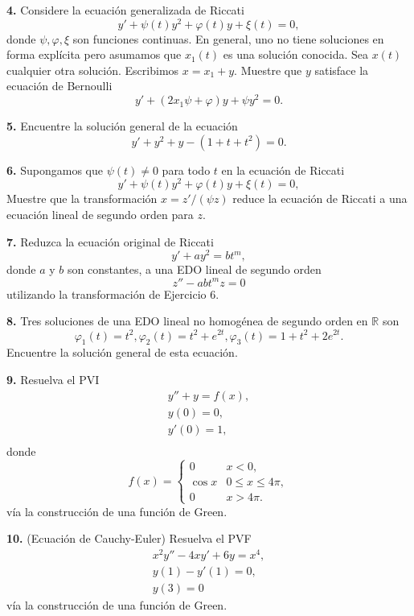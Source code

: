 \documentclass{article}
\newenvironment{statement}[1]{\smallskip\noindent\color[rgb]{1.00,0.00,0.50} {\bf #1.}}{}
\theoremstyle{definition}
\theoremstyle{remark}
\newcommand{\BR}{\mathbb R}
\begin{document}
\begin{statement}{4}
  Considere la ecuaci\'on generalizada de Riccati
  \[
    y' + \psi(t) y^2 + \varphi(t) y + \xi(t) = 0,
  \]
  donde $\psi, \varphi, \xi$ son funciones continuas.
  En general, uno no tiene soluciones en forma expl\'icita pero asumamos que
  $x_1(t)$ es una soluci\'on conocida. Sea $x(t)$ cualquier otra soluci\'on.
  Escribimos $x = x_1 + y$. Muestre que $y$ satisface la ecuaci\'on de Bernoulli
  \[
    y' + (2 x_1 \psi + \varphi) y + \psi y^2 = 0.  
  \]
\end{statement}

\begin{statement}{5}
  Encuentre la soluci\'on general de la ecuaci\'on
  \[
    y' + y^2 + y - (1 + t + t^2) = 0.  
  \]
\end{statement}

\begin{statement}{6}
  Supongamos que $\psi(t) \neq 0$ para todo $t$ en la ecuaci\'on de Riccati
  \[
    y' + \psi(t) y^2 + \varphi(t) y + \xi(t) = 0,
  \]
  Muestre que la transformaci\'on $x = z' / (\psi z)$ reduce la ecuaci\'on
  de Riccati a una ecuaci\'on lineal de segundo orden para $z$.
\end{statement}

\begin{statement}{7}
  Reduzca la ecuaci\'on original de Riccati
  \[
    y' + a y^2 = b t^m,  
  \]
  donde $a$ y $b$ son constantes, a una EDO lineal de segundo orden
  \[
    z'' - a b t^m z = 0  
  \]
  utilizando la transformaci\'on de Ejercicio 6.
\end{statement}

\begin{statement}{8}
  Tres soluciones de una EDO lineal no homog\'enea de segundo orden en $\BR$ son
  \[
    \varphi_1(t) = t^2,
    \varphi_2(t) = t^2 + e^{2t},
    \varphi_3(t) = 1 + t^2 + 2e^{2t}.  
  \]
  Encuentre la soluci\'on general de esta ecuaci\'on.
\end{statement}

\begin{statement}{9}
  Resuelva el PVI
  \begin{gather*}
    y'' + y = f(x),\\
    y(0) = 0,\\
    y'(0) = 1,\\
  \end{gather*}
  donde
  \[
    f(x) =
    \begin{cases}
      0 & x < 0,\\
      \cos x & 0 \leq x \leq 4 \pi,\\
      0 & x > 4 \pi.
    \end{cases}  
  \]
  v\'ia la construcci\'on de una funci\'on de Green.
\end{statement}

\begin{statement}{10}
  (Ecuaci\'on de Cauchy-Euler)
  Resuelva el PVF
  \begin{gather*}
    x^2 y'' - 4xy' + 6y = x^4,\\
    y(1) - y'(1) = 0,\\
    y(3) = 0
  \end{gather*}
  v\'ia la construcci\'on de una funci\'on de Green.
\end{statement}
\end{document}

